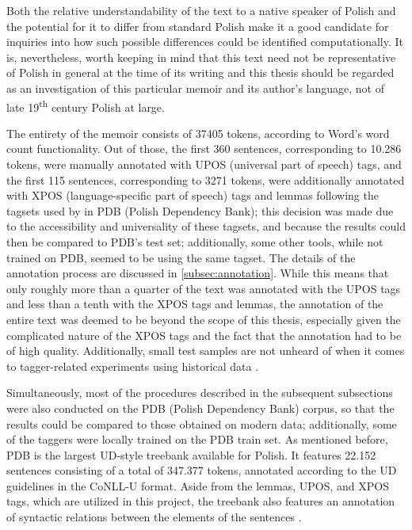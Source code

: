Both the relative understandability of the text to a native speaker of Polish and the potential for it to differ from standard Polish make it a good candidate for inquiries into how such possible differences could be identified computationally. It is, nevertheless, worth keeping in mind that this text need not be representative of Polish in general at the time of its writing and this thesis should be regarded as an investigation of this particular memoir and its author's language, not of late 19\textsuperscript{th} century Polish at large.

The entirety of the memoir consists of 37405 tokens, according to Word's word count functionality. Out of those, the first 360 sentences, corresponding to 10.286 tokens, were manually annotated with UPOS (universal part of speech) tags, and the first 115 sentences, corresponding to 3271 tokens, were additionally annotated with XPOS (language-specific part of speech) tags and lemmas following the tagsets used by \citet{wroblewska-2018-extended} in PDB (Polish Dependency Bank); this decision was made due to the accessibility and universality of these tagsets, and because the results could then be compared to PDB's test set; additionally, some other tools, while not trained on PDB, seemed to be using the same tagset. The details of the annotation process are discussed in \autoref{subsec:annotation}. While this means that only roughly more than a quarter of the text was annotated with the UPOS tags and less than a tenth with the XPOS tags and lemmas, the annotation of the entire text was deemed to be beyond the scope of this thesis, especially given the complicated nature of the XPOS tags and the fact that the annotation had to be of high quality. Additionally, small test samples are not unheard of when it comes to tagger-related experiments using historical data \citep{bollmann-2013-pos, hupkes16, rayson07}. 

Simultaneously, most of the procedures described in the subsequent subsections were also conducted on the PDB (Polish Dependency Bank) corpus, so that the results could be compared to those obtained on modern data; additionally, some of the taggers were locally trained on the PDB train set. As mentioned before, PDB is the largest UD-style treebank available for Polish. It features 22.152 sentences consisting of a total of 347.377 tokens, annotated according to the UD guidelines in the CoNLL-U format. Aside from the lemmas, UPOS, and XPOS tags, which are utilized in this project, the treebank also features an annotation of syntactic relations between the elements of the sentences \citep{wroblewska-2018-extended, universaldependencies}.

